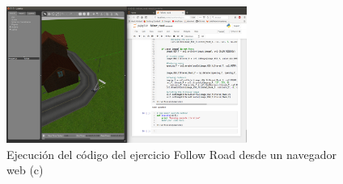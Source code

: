 \begin{figure}[H]
  \begin{center}
    \includegraphics[width=0.7\textwidth]{figures/ejec_3_jup_fr.png}
		\caption{Ejecución del código del ejercicio Follow Road desde un navegador web (c)}
		\label{fig.ecjfr3}
		\end{center}
\end{figure}
